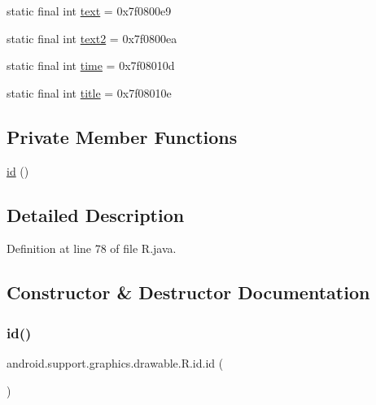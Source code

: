 \begin{DoxyCompactItemize}
\item 
static final int \mbox{\hyperlink{classandroid_1_1support_1_1graphics_1_1drawable_1_1_r_1_1id_ac94c4446921fcc3809b45b4192e599b8}{text}} = 0x7f0800e9
\item 
static final int \mbox{\hyperlink{classandroid_1_1support_1_1graphics_1_1drawable_1_1_r_1_1id_a8497c10b90e0af758ebfd8117e7fed2f}{text2}} = 0x7f0800ea
\item 
static final int \mbox{\hyperlink{classandroid_1_1support_1_1graphics_1_1drawable_1_1_r_1_1id_a7083b3897e0b0ff17169442245632f35}{time}} = 0x7f08010d
\item 
static final int \mbox{\hyperlink{classandroid_1_1support_1_1graphics_1_1drawable_1_1_r_1_1id_ae4c46d15d4cdd1b6504115837b34d591}{title}} = 0x7f08010e
\end{DoxyCompactItemize}
\subsection*{Private Member Functions}
\begin{DoxyCompactItemize}
\item 
\mbox{\hyperlink{classandroid_1_1support_1_1graphics_1_1drawable_1_1_r_1_1id_ae05b98b859825ce7a650d532477ab9e9}{id}} ()
\end{DoxyCompactItemize}


\subsection{Detailed Description}


Definition at line 78 of file R.\+java.



\subsection{Constructor \& Destructor Documentation}
\mbox{\label{classandroid_1_1support_1_1graphics_1_1drawable_1_1_r_1_1id_ae05b98b859825ce7a650d532477ab9e9}} 
\subsubsection{\texorpdfstring{id()}{id()}}
{\footnotesize\ttfamily android.\+support.\+graphics.\+drawable.\+R.\+id.\+id (\begin{DoxyParamCaption}{ }\end{DoxyParamCaption})\hspace{0.3cm}{\ttfamily [private]}}



